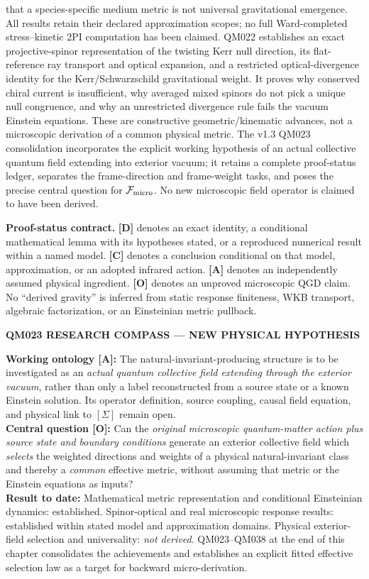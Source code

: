 \documentclass[11pt,a4paper]{article}
\begin{document}
that a species-specific medium metric is not universal gravitational emergence. All results retain their declared approximation scopes; no full Ward-completed stress--kinetic 2PI computation has been claimed. QM022 establishes an exact projective-spinor representation of the twisting Kerr null direction, its flat-reference ray transport and optical expansion, and a restricted optical-divergence identity for the Kerr/Schwarzschild gravitational weight. It proves why conserved chiral current is insufficient, why averaged mixed spinors do not pick a unique null congruence, and why an unrestricted divergence rule fails the vacuum Einstein equations. These are constructive geometric/kinematic advances, not a microscopic derivation of a common physical metric. The v1.3 QM023 consolidation incorporates the explicit working hypothesis of an actual collective quantum field extending into exterior vacuum; it retains a complete proof-status ledger, separates the frame-direction and frame-weight tasks, and poses the precise central question for $\mathcal F_{\rm micro}$. No new microscopic field operator is claimed to have been derived.

\textbf{Proof-status contract.} \textbf{[D]} denotes an exact identity, a conditional mathematical lemma with its hypotheses stated, or a reproduced numerical result within a named model. \textbf{[C]} denotes a conclusion conditional on that model, approximation, or an adopted infrared action. \textbf{[A]} denotes an independently assumed physical ingredient. \textbf{[O]} denotes an unproved microscopic QGD claim. No ``derived gravity'' is inferred from static response finiteness, WKB transport, algebraic factorization, or an Einsteinian metric pullback.
\begin{center}
{\color{navy}\bfseries QM023 RESEARCH COMPASS --- NEW PHYSICAL HYPOTHESIS}
\end{center}
\noindent\textbf{Working ontology [A]:} The natural-invariant-producing structure is to be investigated as an \emph{actual quantum collective field extending through the exterior vacuum}, rather than only a label reconstructed from a source state or a known Einstein solution. Its operator definition, source coupling, causal field equation, and physical link to $[\Sigma]$ remain open.\\[4pt]
\noindent\textbf{Central question [O]:} Can the \emph{original microscopic quantum-matter action plus source state and boundary conditions} generate an exterior collective field which \emph{selects} the weighted directions and weights of a physical natural-invariant class and thereby a \emph{common} effective metric, without assuming that metric or the Einstein equations as inputs?\\[4pt]
\noindent\textbf{Result to date:} Mathematical metric representation and conditional Einsteinian dynamics: established. Spinor-optical and real microscopic response results: established within stated model and approximation domains. Physical exterior-field selection and universality: \emph{not derived}. QM023--QM038 at the end of this chapter consolidates the achievements and establishes an explicit fitted effective selection law as a target for backward micro-derivation.
\end{document}
